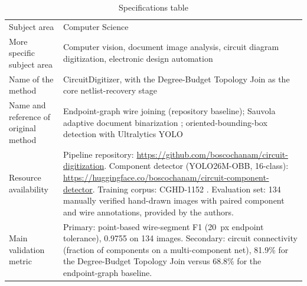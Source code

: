 \begin{table}[H]
\centering
\caption{Specifications table}
\begin{tabularx}{\textwidth}{>{\raggedright\arraybackslash}p{}X}
\toprule
Subject area & Computer Science \\
More specific subject area & Computer vision, document image analysis, circuit diagram digitization, electronic design automation \\
Name of the method & CircuitDigitizer, with the Degree-Budget Topology Join as the core netlist-recovery stage \\
Name and reference of original method & Endpoint-graph wire joining (repository baseline); Sauvola adaptive document binarization \cite{Sauvola2000}; oriented-bounding-box detection with Ultralytics YOLO \cite{UltralyticsYOLO} \\
Resource availability & Pipeline repository: \url{https://github.com/boscochanam/circuit-digitization}. Component detector (YOLO26M-OBB, 16-class): \url{https://huggingface.co/boscochanam/circuit-component-detector}. Training corpus: CGHD-1152 \cite{Thoma2021}. Evaluation set: 134 manually verified hand-drawn images with paired component and wire annotations, provided by the authors. \\
Main validation metric & Primary: point-based wire-segment F1 (20~px endpoint tolerance), 0.9755 on 134 images. Secondary: circuit connectivity (fraction of components on a multi-component net), 81.9\% for the Degree-Budget Topology Join versus 68.8\% for the endpoint-graph baseline. \\
\bottomrule
\end{tabularx}
\end{table}
